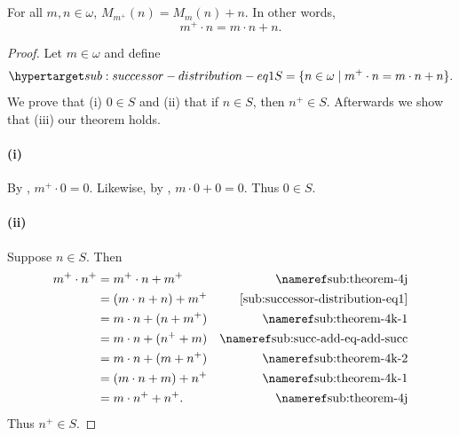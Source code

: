 \documentclass{report}
\begin{document}
\subsection{}%

\begin{lemma}[5]

  For all $m, n \in \omega$, $M_{m^+}(n) = M_m(n) + n$.
  In other words, $$m^+ \cdot n = m \cdot n + n.$$

\end{lemma}

\begin{proof}


  Let $m \in \omega$ and define
    \begin{equation}
      \hyperlabel{sub:successor-distribution-eq1}
      S = \{n \in \omega \mid m^+ \cdot n = m \cdot n + n\}.
    \end{equation}
  We prove that (i) $0 \in S$ and (ii) that if $n \in S$, then $n^+ \in S$.
  Afterwards we show that (iii) our theorem holds.

  \paragraph{(i)}%

    By , $m^+ \cdot 0 = 0$.
    Likewise, by , $m \cdot 0 + 0 = 0$.
    Thus $0 \in S$.

  \paragraph{(ii)}%

    Suppose $n \in S$.
    Then
      \begin{align*}
        m^+ \cdot n^+
          & = m^+ \cdot n + m^+ & \textref{sub:theorem-4j} \\
          & = (m \cdot n + n) + m^+ & \eqref{sub:successor-distribution-eq1} \\
          & = m \cdot n + (n + m^+) & \textref{sub:theorem-4k-1} \\
          & = m \cdot n + (n^+ + m) & \textref{sub:succ-add-eq-add-succ} \\
          & = m \cdot n + (m + n^+) & \textref{sub:theorem-4k-2} \\
          & = (m \cdot n + m) + n^+ & \textref{sub:theorem-4k-1} \\
          & = m \cdot n^+ + n^+. & \textref{sub:theorem-4j}
      \end{align*}
    Thus $n^+ \in S$.


\end{proof}
\end{document}
